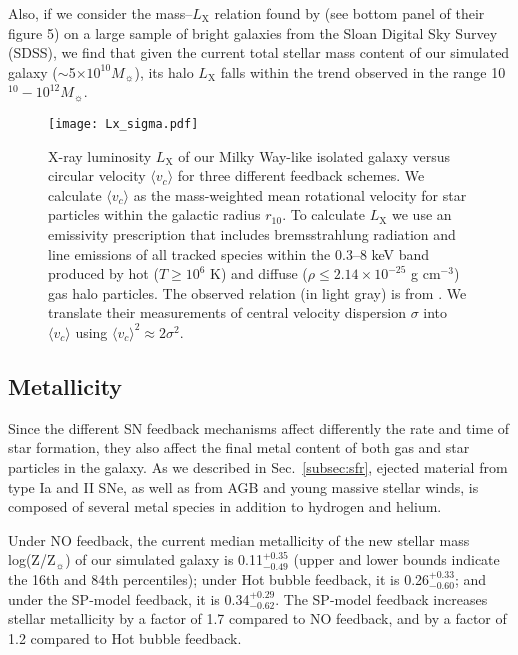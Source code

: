 \documentclass[iop]{emulateapj}
\begin{document}
Also, if we consider the mass--$L_{\mathrm{X}}$ relation found by \citet{Anderson15} (see bottom panel of their figure 5) on a large sample of bright galaxies from the Sloan Digital Sky Survey (SDSS), we find that given the current total stellar mass content of our simulated galaxy ($\sim$5$\times 10^{10} M_{\sun}$), its halo $L_{\mathrm{X}}$ falls within the trend observed in the range 10$^{10}-10^{12} M_{\sun}$.

\begin{figure}
\texttt{[image: Lx\_sigma.pdf]}
\caption{X-ray luminosity $L_{\mathrm{X}}$ of our Milky Way-like isolated galaxy versus circular velocity $\langle v_c \rangle$ for three different feedback schemes. We calculate $\langle v_c \rangle$ as the mass-weighted mean rotational velocity for star particles within the galactic radius $r_{10}$. To calculate $L_{\mathrm{X}}$ we use an emissivity prescription that includes bremsstrahlung radiation and line emissions of all tracked species within the 0.3--8 keV band produced by hot ($T \ge 10^6$ K) and diffuse ($\rho \le 2.14\times 10^{-25}$ g cm$^{-3}$) gas halo particles. The observed relation (in light gray) is from \citet{Boroson11}. We translate their measurements of central velocity dispersion $\sigma$ into $\langle v_c \rangle$ using $\langle v_c \rangle^2 \approx 2\sigma^2$.}
\label{fig:Lx_isolated}
\end{figure}

\subsection{Metallicity}\label{subsec:res_metallicity}
Since the different SN feedback mechanisms affect differently the rate and time of star formation, they also affect the final metal content of both gas and star particles in the galaxy. As we described in Sec.~\ref{subsec:sfr}, ejected material from type Ia and II SNe, as well as from AGB and young massive stellar winds, is composed of several metal species in addition to hydrogen and helium.

Under NO feedback, the current median metallicity of the new stellar mass log(Z/Z$_{\sun}$) of our simulated galaxy is 0.11$^{+0.35}_{-0.49}$ (upper and lower bounds indicate the 16th and 84th percentiles); under Hot bubble feedback, it is 0.26$^{+0.33}_{-0.60}$; and under the SP-model feedback, it is 0.34$^{+0.29}_{-0.62}$. The SP-model feedback increases stellar metallicity by a factor of 1.7 compared to NO feedback, and by a factor of 1.2 compared to Hot bubble feedback.
\end{document}
